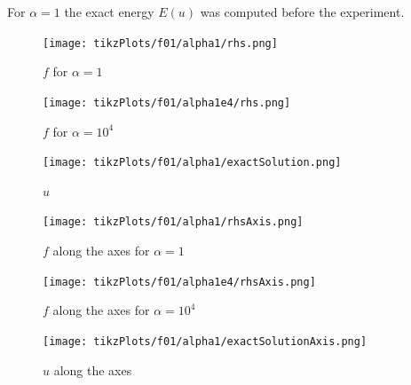 \documentclass[draft=false,twoside,12pt]{scrreprt}
\begin{document}
For $\alpha=1$ the exact energy $E(u)$ was computed before the experiment.

\begin{minipage}[t]{0.3\textwidth}
  \begin{figure}[H]
	  \centering
		\texttt{[image: tikzPlots/f01/alpha1/rhs.png]} 
		\caption{$f$ for $\alpha=1$}
  \end{figure}
\end{minipage}
\hfill
\vline
\hfill
\begin{minipage}[t]{0.3\textwidth}
  \begin{figure}[H]
	  \centering
		\texttt{[image: tikzPlots/f01/alpha1e4/rhs.png]} 
		\caption{$f$ for $\alpha=10^4$}
  \end{figure}
\end{minipage}
\hfill
\vline
\hfill
\begin{minipage}[t]{0.3\textwidth}
  \begin{figure}[H]
	  \centering
		\texttt{[image: tikzPlots/f01/alpha1/exactSolution.png]} 
		\caption{$u$}
  \end{figure}
\end{minipage}

\begin{minipage}[t]{0.3\textwidth}
  \begin{figure}[H]
	  \centering
		\texttt{[image: tikzPlots/f01/alpha1/rhsAxis.png]} 
		\caption{$f$ along the axes for $\alpha=1$}
  \end{figure}
\end{minipage}
\hfill
\vline
\hfill
\begin{minipage}[t]{0.3\textwidth}
  \begin{figure}[H]
	  \centering
		\texttt{[image: tikzPlots/f01/alpha1e4/rhsAxis.png]} 
		\caption{$f$ along the axes for $\alpha=10^4$}
  \end{figure}
\end{minipage}
\hfill
\vline
\hfill
\begin{minipage}[t]{0.3\textwidth}
  \begin{figure}[H]
	  \centering
		\texttt{[image: tikzPlots/f01/alpha1/exactSolutionAxis.png]} 
		\caption{$u$ along the axes}
  \end{figure}
\end{minipage}
\end{document}
